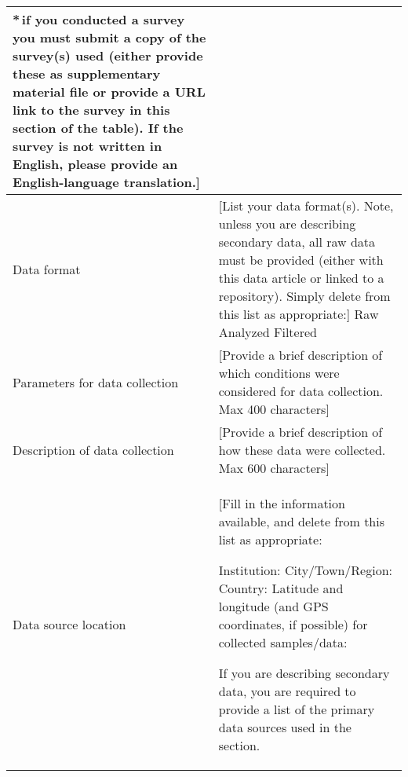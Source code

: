 \documentclass[times,final]{elsarticle}
\begin{document}
{\begin{longtable}{|p{33mm}|p{94mm}|}
                         {\fontsize{7pt}{8pt}\selectfont
                         *\,if you conducted a survey you must submit a copy of the
                         survey(s) used (either provide these as supplementary material
                         file or provide a URL link to the survey
                         in this section of the table).
                         If the survey is not written in English,
                         please provide an English-language translation.}]\\
\hline
Data format            & [List your data format(s). Note, unless you are describing secondary data,
                         all raw data must be provided (either with this data article or linked to a repository).
                         Simply delete from this list as appropriate:]\newline
                         Raw\newline
                         Analyzed\newline
                         Filtered\\
\hline
Parameters for
data\newline
collection             & [Provide a brief description of which conditions were considered
                         for data collection. Max 400 characters]\\

\hline
Description of
data\newline
collection             & [Provide a brief description of how these data were collected.
                         Max 600 characters]\\
\hline
Data source location   & [Fill in the information available, and delete from this list as appropriate:\newline

                         Institution:\newline
                         City/Town/Region:\newline
                         Country:\newline
                         Latitude and longitude (and GPS coordinates, if possible) for collected samples/data:\newline


                         If you are describing secondary data, you are required to provide a list of
                         the primary data sources used in the section.\newline


\end{longtable}}
\end{document}
